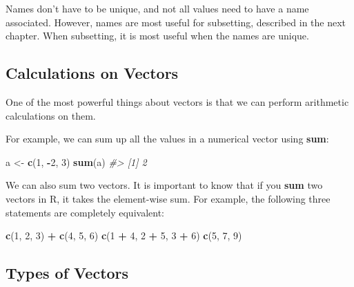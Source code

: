 \documentclass[]{book}
\newenvironment{Shaded}{\begin{snugshade}}{\end{snugshade}}
\newcommand{\KeywordTok}[1]{\textcolor[rgb]{0.13,0.29,0.53}{\textbf{#1}}}
\newcommand{\DecValTok}[1]{\textcolor[rgb]{0.00,0.00,0.81}{#1}}
\newcommand{\StringTok}[1]{\textcolor[rgb]{0.31,0.60,0.02}{#1}}
\newcommand{\CommentTok}[1]{\textcolor[rgb]{0.56,0.35,0.01}{\textit{#1}}}
\newcommand{\OperatorTok}[1]{\textcolor[rgb]{0.81,0.36,0.00}{\textbf{#1}}}
\newcommand{\NormalTok}[1]{#1}
\begin{document}
Names don't have to be unique, and not all values need to have a name
associated. However, names are most useful for subsetting, described in
the next chapter. When subsetting, it is most useful when the names are
unique.

\subsection{Calculations on Vectors}\label{calculations-on-vectors}

One of the most powerful things about vectors is that we can perform
arithmetic calculations on them.

For example, we can sum up all the values in a numerical vector using
\textbf{sum}:

\begin{Shaded}
\begin{Highlighting}[]
\NormalTok{a <-}\StringTok{ }\KeywordTok{c}\NormalTok{(}\DecValTok{1}\NormalTok{, }\OperatorTok{-}\DecValTok{2}\NormalTok{, }\DecValTok{3}\NormalTok{)}
\KeywordTok{sum}\NormalTok{(a)}
\CommentTok{#> [1] 2}
\end{Highlighting}
\end{Shaded}

We can also sum two vectors. It is important to know that if you
\textbf{sum} two vectors in R, it takes the element-wise sum. For
example, the following three statements are completely equivalent:

\begin{Shaded}
\begin{Highlighting}[]
\KeywordTok{c}\NormalTok{(}\DecValTok{1}\NormalTok{, }\DecValTok{2}\NormalTok{, }\DecValTok{3}\NormalTok{) }\OperatorTok{+}\StringTok{ }\KeywordTok{c}\NormalTok{(}\DecValTok{4}\NormalTok{, }\DecValTok{5}\NormalTok{, }\DecValTok{6}\NormalTok{)}
\KeywordTok{c}\NormalTok{(}\DecValTok{1} \OperatorTok{+}\StringTok{ }\DecValTok{4}\NormalTok{, }\DecValTok{2} \OperatorTok{+}\StringTok{ }\DecValTok{5}\NormalTok{, }\DecValTok{3} \OperatorTok{+}\StringTok{ }\DecValTok{6}\NormalTok{)}
\KeywordTok{c}\NormalTok{(}\DecValTok{5}\NormalTok{, }\DecValTok{7}\NormalTok{, }\DecValTok{9}\NormalTok{)}
\end{Highlighting}
\end{Shaded}

\subsection{Types of Vectors}\label{types-of-vectors}
\end{document}
